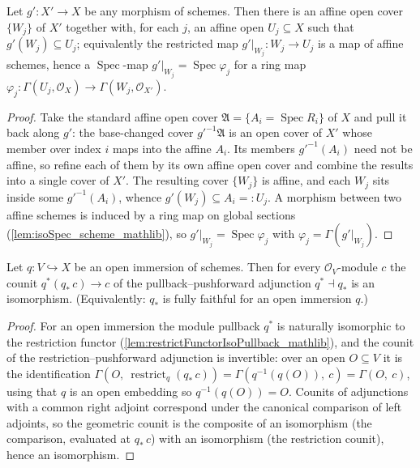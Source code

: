 \begin{lemma}\leanok
  \label{lem:openimm_refining_affine_cover}
  Let \(g' : X' \to X\) be any morphism of schemes. Then there is an affine open cover
  \(\{W_j\}\) of \(X'\) together with, for each \(j\), an affine open \(U_j \subseteq X\) such that
  \(g'(W_j) \subseteq U_j\); equivalently the restricted map \(g'|_{W_j} : W_j \to U_j\) is a map
  of affine schemes, hence a \(\operatorname{Spec}\)-map \(g'|_{W_j} = \operatorname{Spec}\varphi_j\)
  for a ring map \(\varphi_j : \Gamma(U_j, \mathcal{O}_X) \to \Gamma(W_j, \mathcal{O}_{X'})\).
\end{lemma}
\begin{proof}
  Take the standard affine open cover \(\mathfrak{A} = \{A_i = \operatorname{Spec} R_i\}\) of \(X\)
  and pull it back along \(g'\): the base-changed cover \(g'^{-1}\mathfrak{A}\) is an open cover of
  \(X'\) whose member over index \(i\) maps into the affine \(A_i\). Its members \(g'^{-1}(A_i)\)
  need not be affine, so refine each of them by its own affine open cover and combine the results
  into a single cover of \(X'\). The resulting cover \(\{W_j\}\) is affine, and each \(W_j\) sits
  inside some \(g'^{-1}(A_i)\), whence \(g'(W_j) \subseteq A_i =: U_j\). A morphism between two
  affine schemes is induced by a ring map on global sections (\cref{lem:isoSpec_scheme_mathlib}),
  so \(g'|_{W_j} = \operatorname{Spec}\varphi_j\) with \(\varphi_j = \Gamma(g'|_{W_j})\).
\end{proof}

\begin{lemma}\leanok
  \label{lem:openimm_pullback_counit_isIso}
  Let \(q : V \hookrightarrow X\) be an open immersion of schemes.  Then for every
  \(\mathcal{O}_V\)-module \(c\) the counit \(q^*(q_*\,c) \to c\) of the pullback--pushforward
  adjunction \(q^* \dashv q_*\) is an isomorphism.  (Equivalently: \(q_*\) is fully faithful for
  an open immersion \(q\).)
\end{lemma}
\begin{proof}\leanok
  For an open immersion the module pullback \(q^*\) is naturally isomorphic to the restriction
  functor (\cref{lem:restrictFunctorIsoPullback_mathlib}), and the counit of the
  restriction--pushforward adjunction is invertible: over an open \(O \subseteq V\) it is the
  identification \(\Gamma(O,\ \operatorname{restrict}_q (q_*\,c)) = \Gamma(q^{-1}(q(O)),\ c) =
  \Gamma(O,\ c)\), using that \(q\) is an open embedding so \(q^{-1}(q(O)) = O\).  Counits of
  adjunctions with a common right adjoint correspond under the canonical comparison of left
  adjoints, so the geometric counit is the composite of an isomorphism (the comparison, evaluated
  at \(q_*\,c\)) with an isomorphism (the restriction counit), hence an isomorphism.
\end{proof}

